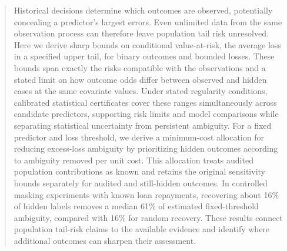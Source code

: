 \begin{abstract}
Historical decisions determine which outcomes are observed, potentially concealing a predictor’s largest errors. Even unlimited data from the same observation process can therefore leave population tail risk unresolved. Here we derive sharp bounds on conditional value-at-risk, the average loss in a specified upper tail, for binary outcomes and bounded losses. These bounds span exactly the risks compatible with the observations and a stated limit on how outcome odds differ between observed and hidden cases at the same covariate values. Under stated regularity conditions, calibrated statistical certificates cover these ranges simultaneously across candidate predictors, supporting risk limits and model comparisons while separating statistical uncertainty from persistent ambiguity. For a fixed predictor and loss threshold, we derive a minimum-cost allocation for reducing excess-loss ambiguity by prioritizing hidden outcomes according to ambiguity removed per unit cost. This allocation treats audited population contributions as known and retains the original sensitivity bounds separately for audited and still-hidden outcomes. In controlled masking experiments with known loan repayments, recovering about 16\% of hidden labels removes a median 61\% of estimated fixed-threshold ambiguity, compared with 16\% for random recovery. These results connect population tail-risk claims to the available evidence and identify where additional outcomes can sharpen their assessment.
\end{abstract}
